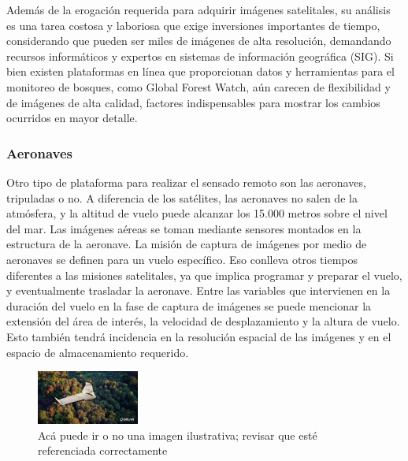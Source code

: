 Además de la erogación requerida para adquirir imágenes satelitales, su análisis es una tarea costosa y laboriosa que exige inversiones importantes de tiempo, considerando que pueden ser miles de imágenes de alta resolución, demandando recursos informáticos y expertos en sistemas de información geográfica (SIG). Si bien existen plataformas en línea que proporcionan datos y herramientas para el monitoreo de bosques, como Global Forest Watch, aún carecen de flexibilidad y de imágenes de alta calidad, factores indispensables para mostrar los cambios ocurridos en mayor detalle.


\subsubsection{Aeronaves}
Otro tipo de plataforma para realizar el sensado remoto son las aeronaves, tripuladas o no. A diferencia de los satélites, las aeronaves no salen de la atmósfera, y la altitud de vuelo puede alcanzar los 15.000 metros sobre el nivel del mar. Las imágenes aéreas se toman mediante sensores montados en la estructura de la aeronave. La misión de captura de imágenes por medio de aeronaves se definen para un vuelo específico. Eso conlleva otros tiempos diferentes a las misiones satelitales, ya que implica programar y preparar el vuelo, y eventualmente trasladar la aeronave. Entre las variables que intervienen en la duración del vuelo en la fase de captura de imágenes se puede mencionar la extensión del área de interés, la velocidad de desplazamiento y la altura de vuelo. Esto también tendrá incidencia en la resolución espacial de las imágenes y en el espacio de almacenamiento requerido.

\begin{figure}
    \includegraphics[width=0.3\textwidth]{Imagenes/dron.jpg}
     \hfill
     \caption{Acá puede ir o no una imagen ilustrativa; revisar que esté referenciada correctamente}
    \label{dron}
\end{figure}
